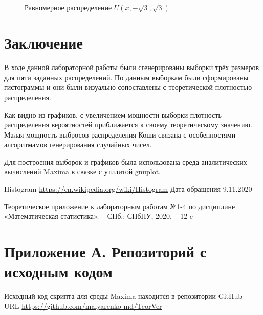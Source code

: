 \documentclass[12pt]{article}
\begin{document}
\begin{flushleft}
\begin{figure}[h!]
\begin{minipage}[h]{0.325\linewidth}
        \end{minipage}
        \caption{Равномерное распределение $U(x, -\sqrt{3}, \sqrt{3})$}
    \end{figure}

\newpage

\section*{Заключение}

В ходе данной лабораторной работы были сгенерированы выборки трёх размеров для пяти заданных распределений. По данным выборкам были сформированы гистограммы и они были визуально сопоставлены с теоретической плотностью распределения.

Как видно из графиков, с увеличением мощности выборки плотность распределения вероятностей приближается к своему теоретическому значению. Малая мощность выбросов распределения Коши связана с особенностями алгоритмамов генерирования случайных чисел.

Для построения выборок и графиков была использована среда аналитических вычислений Maxima в связке с утилитой gnuplot.

\newpage


\begin{thebibliography}{9}
        Histogram \url{https://en.wikipedia.org/wiki/Histogram} Дата обращения 9.11.2020
    
        Теоретическое приложение к лабораторным работам №1-4 по дисциплине «Математическая статистика». -- СПб.: СПбПУ, 2020. -- 12 c 
	
\end{thebibliography}

\newpage

\section*{Приложение А. Репозиторий с исходным кодом}

Исходный код скрипта для среды Maxima находится в репозитории GitHub -- URL \url{https://github.com/malyarenko-md/TeorVer}

\end{flushleft}
\end{document}
